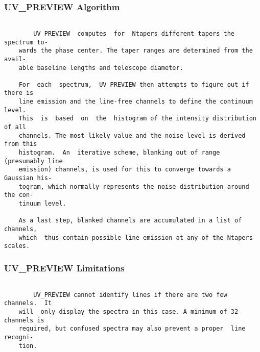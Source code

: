 \subsubsection{UV\_PREVIEW Algorithm}
\begin{verbatim}

        UV_PREVIEW  computes  for  Ntapers different tapers the spectrum to-
    wards the phase center. The taper ranges are determined from the  avail-
    able baseline lengths and telescope diameter.

    For  each  spectrum,  UV_PREVIEW then attempts to figure out if there is
    line emission and the line-free channels to define the continuum  level.
    This  is  based  on  the  histogram of the intensity distribution of all
    channels. The most likely value and the noise level is derived from this
    histogram.  An  iterative scheme, blanking out of range (presumably line
    emission) channels, is used for this to converge towards a Gaussian his-
    togram, which normally represents the noise distribution around the con-
    tinuum level.

    As a last step, blanked channels are accumulated in a list of  channels,
    which  thus contain possible line emission at any of the Ntapers scales.

\end{verbatim}
\subsubsection{UV\_PREVIEW Limitations}
\begin{verbatim}

        UV_PREVIEW cannot identify lines if there are two few  channels.  It
    will  only display the spectra in this case. A minimum of 32 channels is
    required, but confused spectra may also prevent a proper  line  recogni-
    tion.

\end{verbatim}
